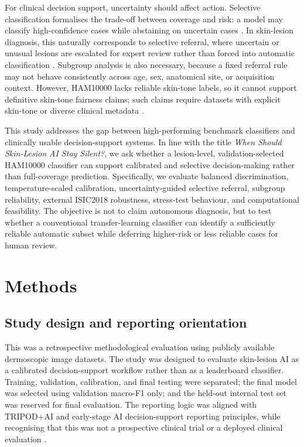 \documentclass[11pt,a4paper]{article}
\begin{document}
For clinical decision support, uncertainty should affect action. Selective classification formalises the trade-off between coverage and risk: a model may classify high-confidence cases while abstaining on uncertain cases \citep{elyaniv2010selective,geifman2019selectivenet}. In skin-lesion diagnosis, this naturally corresponds to selective referral, where uncertain or unusual lesions are escalated for expert review rather than forced into automatic classification \citep{mobiny2019riskaware,fayyad2024conformal}. Subgroup analysis is also necessary, because a fixed referral rule may not behave consistently across age, sex, anatomical site, or acquisition context. However, HAM10000 lacks reliable skin-tone labels, so it cannot support definitive skin-tone fairness claims; such claims require datasets with explicit skin-tone or diverse clinical metadata \citep{groh2021fitzpatrick17k,daneshjou2022disparities,alipour2024skintype,groh2024decision}.

This study addresses the gap between high-performing benchmark classifiers and clinically usable decision-support systems. In line with the title \textit{When Should Skin-Lesion AI Stay Silent?}, we ask whether a lesion-level, validation-selected HAM10000 classifier can support calibrated and selective decision-making rather than full-coverage prediction. Specifically, we evaluate balanced discrimination, temperature-scaled calibration, uncertainty-guided selective referral, subgroup reliability, external ISIC2018 robustness, stress-test behaviour, and computational feasibility. The objective is not to claim autonomous diagnosis, but to test whether a conventional transfer-learning classifier can identify a sufficiently reliable automatic subset while deferring higher-risk or less reliable cases for human review.

\section{Methods}

\subsection{Study design and reporting orientation}

This was a retrospective methodological evaluation using publicly available dermoscopic image datasets. The study was designed to evaluate skin-lesion AI as a calibrated decision-support workflow rather than as a leaderboard classifier. Training, validation, calibration, and final testing were separated; the final model was selected using validation macro-F1 only; and the held-out internal test set was reserved for final evaluation. The reporting logic was aligned with TRIPOD+AI and early-stage AI decision-support reporting principles, while recognising that this was not a prospective clinical trial or a deployed clinical evaluation \citep{collins2024tripodai,vasey2022decideai,liu2020consortai}.
\end{document}
